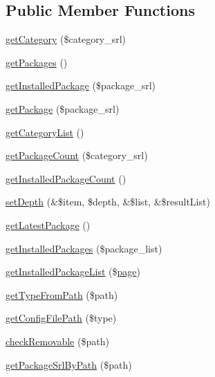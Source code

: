 \subsection*{Public Member Functions}
\begin{DoxyCompactItemize}
\item 
\hyperlink{classautoinstallModel_a8f87ae860d59c5230baded7e25f38b96}{get\+Category} (\$category\+\_\+srl)
\item 
\hyperlink{classautoinstallModel_a32b3e83419ad1f9a01fc95ce8f8db795}{get\+Packages} ()
\item 
\hyperlink{classautoinstallModel_a80912c7d12ec4d37f75d0e1475adab4e}{get\+Installed\+Package} (\$package\+\_\+srl)
\item 
\hyperlink{classautoinstallModel_aaa22f977e7ba5720afda446a6e508c51}{get\+Package} (\$package\+\_\+srl)
\item 
\hyperlink{classautoinstallModel_a64deb99bf9367124115928a6faa12933}{get\+Category\+List} ()
\item 
\hyperlink{classautoinstallModel_a88e07f232668549a2b68478ad42f4005}{get\+Package\+Count} (\$category\+\_\+srl)
\item 
\hyperlink{classautoinstallModel_a1b9cec687d137129acec8db89f8a822b}{get\+Installed\+Package\+Count} ()
\item 
\hyperlink{classautoinstallModel_a9a626cc36cb67b076a07debe5f6c983c}{set\+Depth} (\&\$item, \$depth, \&\$list, \&\$result\+List)
\item 
\hyperlink{classautoinstallModel_a237e95933e438cec978e9382dfee6199}{get\+Latest\+Package} ()
\item 
\hyperlink{classautoinstallModel_a91d9fe9fc6776b5338fca658b5b1a6d8}{get\+Installed\+Packages} (\$package\+\_\+list)
\item 
\hyperlink{classautoinstallModel_a2f132c9c41e1689b3e28df6097dae238}{get\+Installed\+Package\+List} (\$\hyperlink{classpage}{page})
\item 
\hyperlink{classautoinstallModel_a29f5fd06b39d6df431d699efcb0aba47}{get\+Type\+From\+Path} (\$path)
\item 
\hyperlink{classautoinstallModel_afc9baa56522814866589ebe952041a43}{get\+Config\+File\+Path} (\$type)
\item 
\hyperlink{classautoinstallModel_ab4637f5520f16fffe622f5abd73253b0}{check\+Removable} (\$path)
\item 
\hyperlink{classautoinstallModel_a7344733b35feec3a7bcc8a1440d2e682}{get\+Package\+Srl\+By\+Path} (\$path)
\item 

\end{DoxyCompactItemize}
